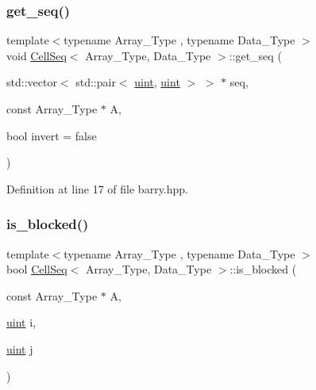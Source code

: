 \subsubsection{\texorpdfstring{get\+\_\+seq()}{get\_seq()}}
{\footnotesize\ttfamily template$<$typename Array\+\_\+\+Type , typename Data\+\_\+\+Type $>$ \\
void \hyperlink{classbarry_1_1_cell_seq}{Cell\+Seq}$<$ Array\+\_\+\+Type, Data\+\_\+\+Type $>$\+::get\+\_\+seq (\begin{DoxyParamCaption}\item[{std\+::vector$<$ std\+::pair$<$ \hyperlink{namespacebarry_a11dfc53ddb4672278319aa04f1e09a6c}{uint}, \hyperlink{namespacebarry_a11dfc53ddb4672278319aa04f1e09a6c}{uint} $>$ $>$ $\ast$}]{seq,  }\item[{const Array\+\_\+\+Type $\ast$}]{A,  }\item[{bool}]{invert = {\ttfamily false} }\end{DoxyParamCaption})\hspace{0.3cm}{\ttfamily [inline]}}



Definition at line 17 of file barry.\+hpp.

\mbox{\label{classbarry_1_1_cell_seq_a32d85d2f118a68b58d1f7a6095ff42ca}} 
\subsubsection{\texorpdfstring{is\+\_\+blocked()}{is\_blocked()}}
{\footnotesize\ttfamily template$<$typename Array\+\_\+\+Type , typename Data\+\_\+\+Type $>$ \\
bool \hyperlink{classbarry_1_1_cell_seq}{Cell\+Seq}$<$ Array\+\_\+\+Type, Data\+\_\+\+Type $>$\+::is\+\_\+blocked (\begin{DoxyParamCaption}\item[{const Array\+\_\+\+Type $\ast$}]{A,  }\item[{\hyperlink{namespacebarry_a11dfc53ddb4672278319aa04f1e09a6c}{uint}}]{i,  }\item[{\hyperlink{namespacebarry_a11dfc53ddb4672278319aa04f1e09a6c}{uint}}]{j }\end{DoxyParamCaption})\hspace{0.3cm}{\ttfamily [inline]}}



